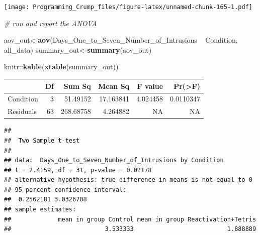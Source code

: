 \documentclass[]{book}
\newenvironment{Shaded}{\begin{snugshade}}{\end{snugshade}}
\newcommand{\KeywordTok}[1]{\textcolor[rgb]{0.13,0.29,0.53}{\textbf{{#1}}}}
\newcommand{\DataTypeTok}[1]{\textcolor[rgb]{0.13,0.29,0.53}{{#1}}}
\newcommand{\StringTok}[1]{\textcolor[rgb]{0.31,0.60,0.02}{{#1}}}
\newcommand{\CommentTok}[1]{\textcolor[rgb]{0.56,0.35,0.01}{\textit{{#1}}}}
\newcommand{\OtherTok}[1]{\textcolor[rgb]{0.56,0.35,0.01}{{#1}}}
\newcommand{\NormalTok}[1]{{#1}}
\theoremstyle{definition}
\theoremstyle{definition}
\theoremstyle{definition}
\theoremstyle{remark}
\begin{document}
\texttt{[image: Programming\_Crump\_files/figure-latex/unnamed-chunk-165-1.pdf]}

\begin{Shaded}
\begin{Highlighting}[]
\CommentTok{# run and report the ANOVA}

\NormalTok{aov_out<-}\KeywordTok{aov}\NormalTok{(Days_One_to_Seven_Number_of_Intrusions ~}\StringTok{ }\NormalTok{Condition, all_data)}
\NormalTok{summary_out<-}\KeywordTok{summary}\NormalTok{(aov_out)}

\NormalTok{knitr::}\KeywordTok{kable}\NormalTok{(}\KeywordTok{xtable}\NormalTok{(summary_out))}
\end{Highlighting}
\end{Shaded}

\begin{tabular}{l|r|r|r|r|r}
\hline
  & Df & Sum Sq & Mean Sq & F value & Pr(>F)\\
\hline
Condition & 3 & 51.49152 & 17.163841 & 4.024458 & 0.0110347\\
\hline
Residuals & 63 & 268.68758 & 4.264882 & NA & NA\\
\hline
\end{tabular}

\begin{Shaded}
\end{Shaded}

\begin{verbatim}
## 
##  Two Sample t-test
## 
## data:  Days_One_to_Seven_Number_of_Intrusions by Condition
## t = 2.4159, df = 31, p-value = 0.02178
## alternative hypothesis: true difference in means is not equal to 0
## 95 percent confidence interval:
##  0.2562181 3.0326708
## sample estimates:
##             mean in group Control mean in group Reactivation+Tetris 
##                          3.533333                          1.888889
\end{verbatim}
\end{document}

